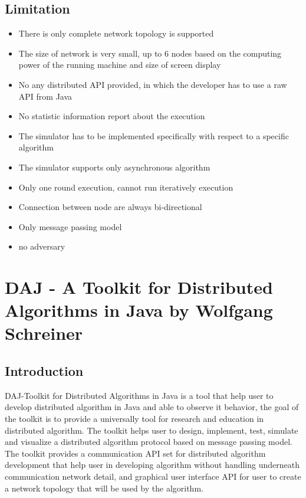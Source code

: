 \subsection*{Limitation}
\begin{itemize}
\item There is only complete network topology is supported
\item The size of network is very small, up to 6 nodes based on the computing power of the running machine and size of screen display
\item No any distributed API provided, in which the developer has to use a raw API from Java
\item No statistic information report about the execution
\item The simulator has to be implemented specifically with respect to a specific algorithm
\item The simulator supports only asynchronous algorithm
\item Only one round execution, cannot run iteratively execution
\item Connection between node are always bi-directional
\item Only message passing model
\item no adversary
\end{itemize}









\section{DAJ - A Toolkit for Distributed Algorithms in Java by Wolfgang Schreiner}

\subsection*{Introduction}
DAJ-Toolkit for Distributed Algorithms in Java is a tool that help user to develop distributed algorithm in Java and able to observe it behavior, the goal of the toolkit is to provide a universally tool for research and education in distributed algorithm. The toolkit helps user to design, implement, test, simulate and visualize a distributed algorithm protocol based on message passing model. The toolkit provides a communication API set for distributed algorithm development that help user in developing algorithm without handling underneath communication network detail, and graphical user interface API for user to create a network topology that will be used by the algorithm.

